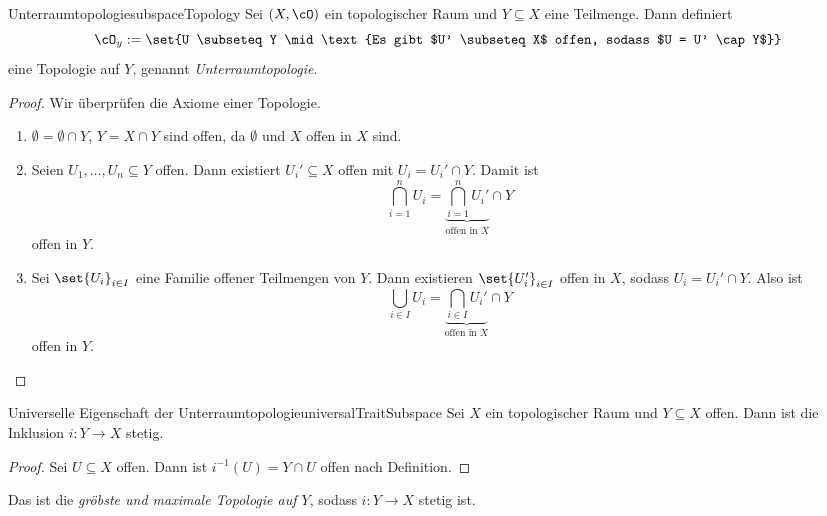 \documentclass[language=ngerman]{TemplateLecture} %
\begin{document}
\begin{thm}{Unterraumtopologie}{subspaceTopology}
    Sei $(X, \cO)$ ein topologischer Raum und $Y \subseteq X$ eine Teilmenge. Dann definiert 
    \begin{equation*}
        \cO_y := \set{U \subseteq Y \mid \text{Es gibt $U' \subseteq X$ offen, sodass $U = U' \cap Y$}}
    \end{equation*}
    eine Topologie auf $Y$, genannt \emph{Unterraumtopologie}.
\end{thm}

\begin{proof}
    Wir überprüfen die Axiome einer Topologie.
    \begin{enumerate}[$(i)$]
        \item $\emptyset = \emptyset \cap Y$, $Y = X \cap Y$ sind offen, da $\emptyset$ und $X$ offen in $X$ sind.
        \item Seien $U_1, \ldots, U_n \subseteq Y$ offen. Dann existiert $U_i' \subseteq X$ offen mit $U_i = U_i' \cap Y$. Damit ist
        \begin{equation*}
            \bigcap_{i = 1}^n U_i = \underset{\text{offen in $X$}}{\underbrace{\bigcap_{i = 1}^n U_i'}} \cap Y
        \end{equation*}
        offen in $Y$.
        \item Sei $\set{U_i}_{i \in I}$ eine Familie offener Teilmengen von $Y$. Dann existieren $\set{U_i'}_{i \in I}$ offen in $X$, sodass $U_i = U_i' \cap Y$. Also ist 
        \begin{equation*}
            \bigcup_{i \in I} U_i = \underset{\text{offen in $X$}}{\underbrace{\bigcap_{i \in I} U_i'}} \cap Y
        \end{equation*}
        offen in $Y$.
    \end{enumerate}
\end{proof}

\begin{lem}{Universelle Eigenschaft der Unterraumtopologie}{universalTraitSubspace}
    Sei $X$ ein topologischer Raum und $Y \subseteq X$ offen. Dann ist die Inklusion $i: Y \to X$ stetig.
\end{lem}

\begin{proof}
    Sei $U \subseteq X$ offen. Dann ist $i^{-1}(U) = Y \cap U$ offen nach Definition.
\end{proof}
Das ist die \emph{gröbste und maximale Topologie auf $Y$}, sodass $i: Y \to X$ stetig ist.
\end{document}
